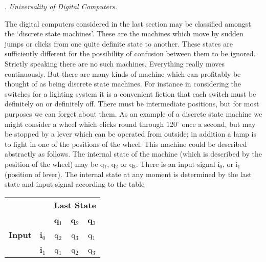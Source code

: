 \documentclass[10pt]{article} %
\begin{document}
\vspace{0.5\baselineskip} %
\noindent{}. \textit{Universality of Digital Computers.}
\vspace{0.5\baselineskip} %

The digital computers considered in the last section may be classified amongst the `discrete state machines'. These are the machines which move by sudden jumps or clicks from one quite definite state to another. These states are sufficiently different for the possibility of confusion between them to be ignored. Strictly speaking there are no such machines. Everything really moves continuously. But there are many kinds of machine which can profitably be thought of as being discrete state machines. For instance in considering the switches for a lighting system it is a convenient fiction that each switch must be definitely on or definitely off. There must be intermediate positions, but for most purposes we can forget about them. As an example of a discrete state machine we might consider a wheel which clicks round through 120$^\circ$ once a second, but may be stopped by a lever which can be operated from outside; in addition a lamp is to light in one of the positions of the wheel. This machine could be described abstractly as follows. The internal state of the machine (which is described by the position of the wheel) may be q$_1$, q$_2$ or q$_3$. There is an input signal i$_0$, or i$_1$ (position of lever). The internal state at any moment is determined by the last state and input signal according to the table
\vspace{0.5\baselineskip} %

\begin{center}
    \normalfont %
    \begin{tabular}{ccccc}
        \multicolumn{2}{c}{} & \multicolumn{3}{c}{\textbf{Last State}} \\
        \multicolumn{2}{c}{} & \textbf{q$_1$} & \textbf{q$_2$} & \textbf{q$_3$} \\
        \textbf{Input} & \textbf{i$_0$} & q$_2$ & q$_3$ & q$_1$ \\
        & \textbf{i$_1$} & q$_1$ & q$_2$ & q$_3$ \\
    \end{tabular}
\end{center}
\vspace{0.5\baselineskip} %
\end{document}

